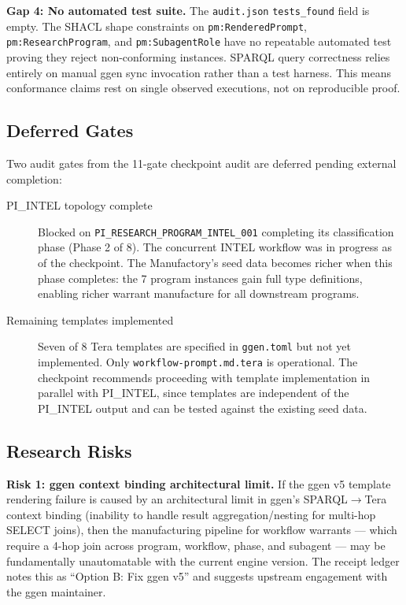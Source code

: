 \textbf{Gap 4: No automated test suite.} The \texttt{audit.json} \texttt{tests\_found}
field is empty. The SHACL shape constraints on \texttt{pm:RenderedPrompt},
\texttt{pm:ResearchProgram}, and \texttt{pm:SubagentRole} have no repeatable automated
test proving they reject non-conforming instances. SPARQL query correctness relies
entirely on manual ggen sync invocation rather than a test harness. This means
conformance claims rest on single observed executions, not on reproducible proof.

\subsection{Deferred Gates}
\label{sec:research-prompt-manufactory-open-deferred}

Two audit gates from the 11-gate checkpoint audit are deferred pending external
completion:

\begin{description}
  \item[PI\_INTEL topology complete] Blocked on
    \texttt{PI\_RESEARCH\_PROGRAM\_INTEL\_001} completing its classification phase
    (Phase 2 of 8). The concurrent INTEL workflow was in progress as of the checkpoint.
    The Manufactory's seed data becomes richer when this phase completes: the 7 program
    instances gain full type definitions, enabling richer warrant manufacture for all
    downstream programs.

  \item[Remaining templates implemented] Seven of 8 Tera templates are specified in
    \texttt{ggen.toml} but not yet implemented. Only \texttt{workflow-prompt.md.tera}
    is operational. The checkpoint recommends proceeding with template implementation
    in parallel with PI\_INTEL, since templates are independent of the PI\_INTEL output
    and can be tested against the existing seed data.
\end{description}

\subsection{Research Risks}
\label{sec:research-prompt-manufactory-open-risks}

\textbf{Risk 1: ggen context binding architectural limit.} If the ggen v5 template
rendering failure is caused by an architectural limit in ggen's SPARQL$\to$Tera context
binding (inability to handle result aggregation/nesting for multi-hop SELECT joins), then
the manufacturing pipeline for workflow warrants --- which require a 4-hop join across
program, workflow, phase, and subagent --- may be fundamentally unautomatable with the
current engine version. The receipt ledger notes this as ``Option B: Fix ggen v5'' and
suggests upstream engagement with the ggen maintainer.

